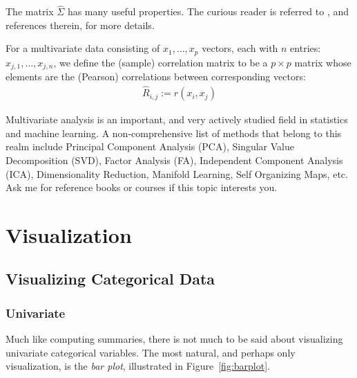 \begin{extra}
The matrix $\hat{\Sigma}$ has many useful properties. 
The curious reader is referred to \cite{petersen_matrix_2006}, and references therein, for more details.
\end{extra}

\begin{definition}
For a multivariate data consisting of $x_1,\dots,x_p$ vectors, each with $n$ entries: $x_{j,1},\dots,x_{j,n}$, we define the (sample) correlation matrix to be a $p\times p$ matrix whose elements are the (Pearson) correlations between corresponding vectors:
\begin{align}
	\hat{R}_{i,j}:= r(x_i, x_j)
\end{align}
\end{definition}


\begin{extra}
Multivariate analysis is an important, and very actively studied field in statistics and machine learning.
A non-comprehensive list of methods that belong to this realm include 
Principal Component Analysis (PCA),
Singular Value Decomposition (SVD), 
Factor Analysis (FA), 
Independent Component Analysis (ICA),
Dimensionality Reduction, 
Manifold Learning, 
Self Organizing Maps, 
etc.
Ask me for reference books or courses if this topic interests you.
\end{extra}

\afterpage{\clearpage}


\section{Visualization}
\label{sec:visualizations}

\subsection{Visualizing Categorical Data}



\subsubsection{Univariate}
Much like computing summaries, there is not much to be said about visualizing univariate categorical variables. 
The most natural, and perhaps only visualization, is the \emph{bar plot}, illustrated in Figure~\ref{fig:barplot}.



